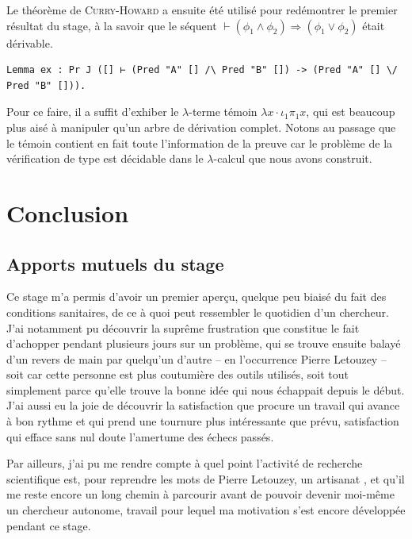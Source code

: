\documentclass[a4paper]{article}
\begin{document}
Le théorème de \textsc{Curry-Howard} a ensuite été utilisé pour redémontrer le premier résultat du stage, à la savoir que le séquent $\vdash (\phi_1 \wedge \phi_2) \Rightarrow (\phi_1 \vee \phi_2)$ était dérivable.
\begin{verbatim}
Lemma ex : Pr J ([] ⊢ (Pred "A" [] /\ Pred "B" []) -> (Pred "A" [] \/ Pred "B" [])).
\end{verbatim}
Pour ce faire, il a suffit d'exhiber le $\lambda$-terme témoin $\lambda x \cdot \iota_1 \pi_1 x$, qui est beaucoup plus aisé à manipuler qu'un arbre de dérivation complet. Notons au passage que le témoin contient en fait toute l'information de la preuve car le problème de la vérification de type est décidable dans le $\lambda$-calcul que nous avons construit.

\newpage


\section*{Conclusion}

\subsection*{Apports mutuels du stage}

Ce stage m'a permis d'avoir un premier aperçu, quelque peu biaisé du fait des conditions sanitaires, de ce à quoi peut ressembler le quotidien d'un chercheur. J'ai notamment pu découvrir la suprême frustration que constitue le fait d'achopper pendant plusieurs jours sur un problème, qui se trouve ensuite balayé d'un revers de main par quelqu'un d'autre -- en l'occurrence Pierre Letouzey -- soit car cette personne est plus coutumière des outils utilisés, soit tout simplement parce qu'elle trouve la bonne idée qui nous échappait depuis le début. J'ai aussi eu la joie de découvrir la satisfaction que procure un travail qui avance à bon rythme et qui prend une tournure plus intéressante que prévu, satisfaction qui efface sans nul doute l'amertume des échecs passés.

Par ailleurs, j'ai pu me rendre compte à quel point l'activité de recherche scientifique est, pour reprendre les mots de Pierre Letouzey, un \og artisanat \fg{}, et qu'il me reste encore un long chemin à parcourir avant de pouvoir devenir moi-même un chercheur autonome, travail pour lequel ma motivation s'est encore développée pendant ce stage.
\end{document}
